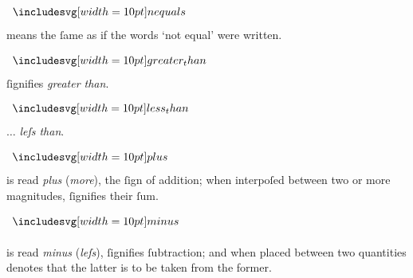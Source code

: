 \begin{minipage}[t]{0.20\textwidth}
    \begin{center}
        $\bnequals$
    \end{center}
\end{minipage}%
\begin{minipage}[t]{0.80\textwidth}
    means the ſame as if the words ‘not equal’ were written.
\end{minipage}

\begin{minipage}[t]{0.20\textwidth}
    \begin{center}
        $\bgt$
    \end{center}
\end{minipage}%
\begin{minipage}[t]{0.80\textwidth}
    ſignifies \textit{greater than}.
\end{minipage}

\begin{minipage}[t]{0.20\textwidth}
    \begin{center}
        $\blt$
    \end{center}
\end{minipage}%
\begin{minipage}[t]{0.80\textwidth}
    $\ldots$ \textit{leſs than}.
\end{minipage}

\begin{minipage}[t]{0.20\textwidth}
    \begin{center}
        $\bplus$
    \end{center}
\end{minipage}%
\begin{minipage}[t]{0.80\textwidth}
    is read \textit{plus} (\textit{more}), the ſign of addition; when interpoſed between two or more magnitudes, ſignifies their ſum.
\end{minipage}

\begin{minipage}[t]{0.20\textwidth}
    \begin{center}
        $\bminus$
    \end{center}
\end{minipage}%
\begin{minipage}[t]{0.80\textwidth}
    is read \textit{minus} (\textit{leſs}), ſignifies ſubtraction; and when placed between two quantities denotes that the latter is to be taken from the former.
\end{minipage}

